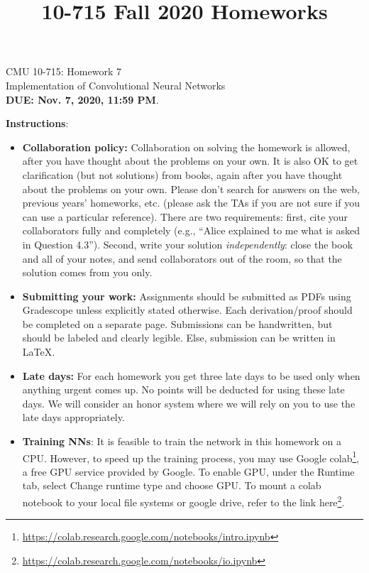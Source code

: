 \documentclass{article}
\title{10-715 Fall 2020 Homeworks}
\begin{document}
\begin{center}
{\Large CMU 10-715: Homework 7}\\
Implementation of Convolutional Neural Networks \\
{\bf DUE: Nov. 7, 2020, 11:59 PM}.\\
\end{center}

\textbf{\large Instructions}:
\begin{itemize}
    \item \textbf{Collaboration policy:} Collaboration on solving the homework is allowed, after you have thought about the problems on your own. It is also OK to get clarification (but not solutions) from books, again after you have thought about the problems on your own. Please don’t search for answers on the web, previous years’ homeworks, etc. (please ask the TAs if you are not sure if you can use a particular reference). There are two requirements: first, cite your collaborators fully and completely (e.g., ``Alice explained to me what is asked in Question 4.3''). Second, write your solution \emph{independently}: close the book and all of your notes, and send collaborators out of the room, so that the solution comes from you only. 
    \item \textbf{Submitting your work:} Assignments should be submitted as PDFs using Gradescope unless explicitly stated otherwise. Each derivation/proof should be completed on a separate page. Submissions can be handwritten, but should be labeled and clearly legible. Else, submission can be written in LaTeX.
    
    \item \textbf{Late days:} For each homework you get three late days to be used only when anything urgent comes up. No points will be deducted for using these late days. We will consider an honor system where we will rely on you to use the late days appropriately.
    
    \item \textbf{Training NNs}: It is feasible to train the network in this homework on a CPU. However, to speed up the training process, you may use Google colab\footnote{\url{https://colab.research.google.com/notebooks/intro.ipynb}}, a free GPU service provided by Google. To enable GPU, under the Runtime tab, select Change runtime type and choose GPU. To mount a colab notebook to your local file systems or google drive, refer to the link here\footnote{\url{https://colab.research.google.com/notebooks/io.ipynb}}.
    

\end{itemize}
\end{document}
